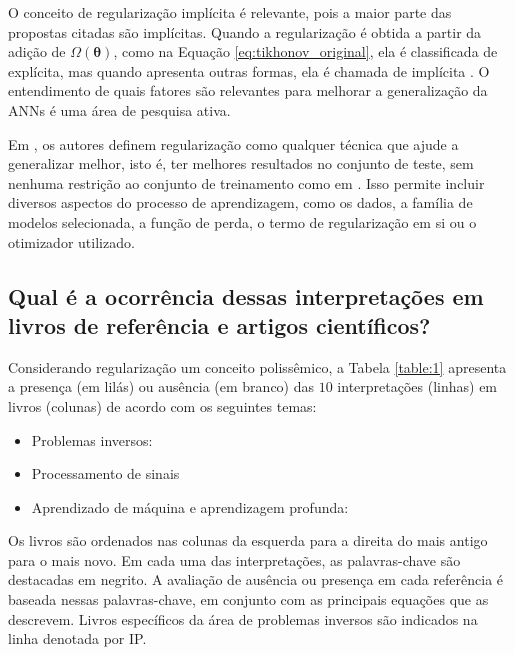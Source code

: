 O conceito de regularização implícita é relevante, pois a maior parte das propostas citadas são implícitas. Quando a regularização é obtida a partir da adição de $\Omega(\bm{\theta})$, como na Equação \eqref{eq:tikhonov_original}, ela é classificada de explícita, mas quando apresenta outras formas, ela é chamada de implícita \cite{Chen2002}. O entendimento de quais fatores são relevantes para melhorar a generalização da ANNs é uma área de pesquisa ativa. 

Em \cite{2017kukacka}, os autores definem regularização como qualquer técnica que ajude a generalizar melhor, isto é, ter melhores resultados no conjunto de teste, sem nenhuma restrição ao conjunto de treinamento como em \cite{goodfellow2016deep}. Isso permite incluir diversos aspectos do processo de aprendizagem, como os dados, a família de modelos selecionada, a função de perda, o termo de regularização em si ou o otimizador utilizado. 

\subsection{Qual é a ocorrência dessas interpretações em livros de referência e artigos científicos?}

Considerando regularização um conceito polissêmico, a Tabela \ref{table:1} apresenta a presença (em lilás) ou ausência (em branco) das $10$ interpretações (linhas) em livros (colunas) de acordo com os seguintes temas:

\begin{itemize}
\item Problemas inversos:  \cite{tarantola2005inverse, hansen2010discrete, Mueller2012, aster2019parameter, Bertero2021}
\item Processamento de sinais \cite{alvarez2017digital} 
\item Aprendizado de máquina e aprendizagem profunda: \cite{Deisenroth2020, goodfellow2016deep, Peng2023, Vandenbussche2023}
\end{itemize}
Os livros são ordenados nas colunas da esquerda para a direita do mais antigo para o mais novo. Em cada uma das interpretações, as palavras-chave são destacadas em negrito. A avaliação de ausência ou presença em cada referência é baseada nessas palavras-chave, em conjunto com as principais equações que as descrevem. Livros específicos da área de problemas inversos são indicados na linha denotada por IP.


